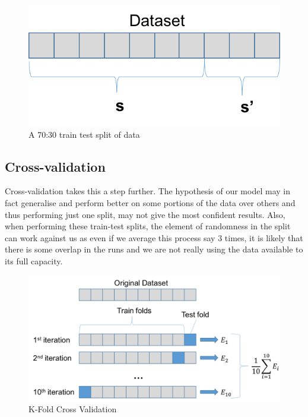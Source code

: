 \documentclass[12pt,a4paper,twoside]{report}
\begin{document}
\begin{figure}[H]

\centering
\includegraphics[scale=0.8]{train-test-split}
\caption{A 70:30 train test split of data}
\end{figure}

\subsection{Cross-validation}

Cross-validation takes this a step further. The hypothesis of our model may in fact generalise and perform better on some portions of the data over others and thus performing just one split, may not give the most confident results. Also, when performing these train-test splits, the element of randomness in the split can work against us as even if we average this process say 3 times, it is likely that there is some overlap in the runs and we are not really using the data available to its full capacity. 

\begin{figure}[H]

\centering
\includegraphics[scale=0.8]{cross-val}
\caption{K-Fold Cross Validation}
\end{figure}
\end{document}
